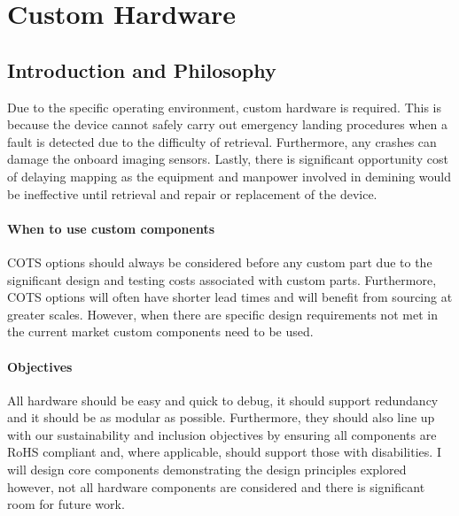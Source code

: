 \newpage
{}
\section{Custom Hardware} \label{section:Custom Hardware}
\subsection{Introduction and Philosophy}
Due to the specific operating environment, custom hardware is required. This is because the device cannot safely carry out emergency landing procedures when a fault is detected due to the difficulty of retrieval. Furthermore, any crashes can damage the onboard imaging sensors. Lastly, there is significant opportunity cost of delaying mapping as the equipment and manpower involved in demining would be ineffective until retrieval and repair or replacement of the device. 
\paragraph{When to use custom components}
\gls{COTS} options should always be considered before any custom part due to the significant design and testing costs associated with custom parts. Furthermore, \gls{COTS} options will often have shorter lead times and will benefit from sourcing at greater scales. However, when there are specific design requirements not met in the current market custom components need to be used.
\paragraph{Objectives}
All hardware should be easy and quick to debug, it should support redundancy and it should be as modular as possible. Furthermore, they should also line up with our sustainability and inclusion objectives by ensuring all components are \gls{RoHS} compliant and, where applicable, should support those with disabilities. I will design core components demonstrating the design principles explored however, not all hardware components are considered and there is significant room for future work.



